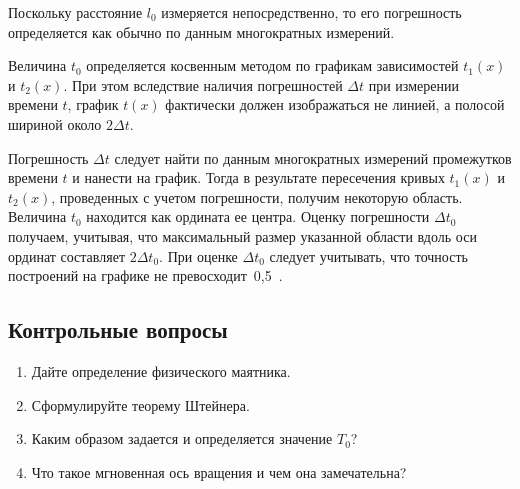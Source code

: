 \documentclass[a4paper, 12pt]{extarticle}
\begin{document}
Поскольку расстояние $l_0$ измеряется непосредственно, то его погрешность определяется как обычно по данным многократных измерений.

Величина $t_0$ определяется косвенным методом по графикам зависимостей $t_1(x)$ и $t_2(x)$.  При этом вследствие наличия погрешностей $\Delta t$ при измерении времени $t$, график $t(x)$ фактически должен изображаться не линией, а полосой шириной около $2 \Delta t$. %

Погрешность $\Delta t$ следует найти по данным многократных измерений промежутков времени $t$ и нанести на график. Тогда в результате пересечения  кривых $t_1(x)$ и $t_2(x)$, проведенных с учетом погрешности, получим некоторую область. Величина $t_0$ находится как ордината ее центра. Оценку погрешности $\Delta t_0$ получаем, учитывая, что максимальный размер указанной области вдоль оси ординат составляет $2 \Delta t_0$. При оценке $\Delta t_0$ следует учитывать, что точность построений на графике не превосходит~0,5~. %

\subsection{Контрольные вопросы}
\begin{enumerate}
\item Дайте определение физического маятника.
\item Сформулируйте теорему Штейнера.
\item Каким образом задается и определяется значение $T_0$?
\item Что такое мгновенная ось вращения и чем она замечательна?
\end{enumerate}
\end{document}
